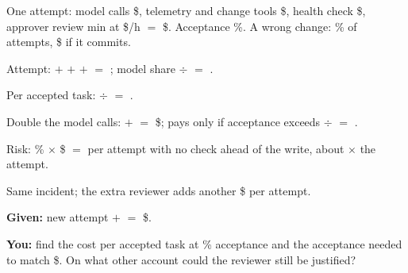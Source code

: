 \documentclass{studysheet}
\begin{document}
\begin{leftcol}
\begin{practicebox}\raggedright{}
One attempt: model calls \$, telemetry and change tools \$, health check
\$, approver review  min at \$/h $=$ \$. Acceptance
\%. A wrong change: \% of attempts, \$ if it commits.\par\vspace{5pt}
{\centering
{}\par}\vspace{4pt}
\begin{steps}
\item Attempt:  $+$  $+$  $+$  $=$ ; model share
   $\div$  $=$ .
\item Per accepted task:  $\div$  $=$ .
\item Double the model calls:  $+$  $=$ \$; pays only if acceptance exceeds
   $\div$  $=$ .
\item Risk: \% $\times$ \$ $=$  per attempt with no check ahead of the write,
  about $\times$ the attempt.
\end{steps}
\end{practicebox}

\vspace{10pt}
\begin{practicebox}\raggedright{}
Same incident; the extra reviewer adds another \$ per attempt.\par\vspace{4pt}
\textbf{Given:} new attempt  $+$  $=$ \$.\par
\textbf{You:} find the cost per accepted task at \% acceptance and the acceptance needed to match
\$. On what other account could the reviewer still be justified?\par\vspace{30pt}
\end{practicebox}
\end{leftcol}%
\end{document}
